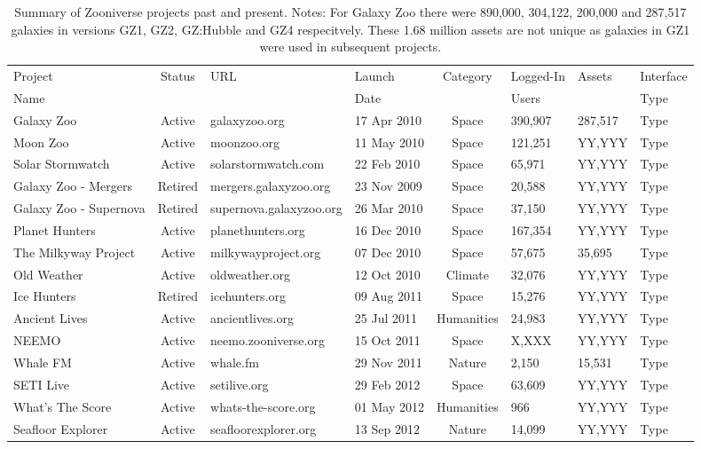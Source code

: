 \documentclass{sigchi}
\begin{document}
\begin{table*}
\begin{center}
\caption{Summary of Zooniverse projects past and present.
Notes: For Galaxy Zoo there were 890,000, 304,122, 200,000 and 287,517 galaxies in versions GZ1, GZ2, GZ:Hubble and GZ4 respecitvely. These 1.68 million assets are not unique as galaxies in GZ1 were used in subsequent projects.}
\begin{tabular}{lcllclll}
\hline
Project & Status & URL & Launch & Category & Logged-In & Assets & Interface \\
Name &  &  & Date &  & Users &  &  Type \\
\hline
Galaxy Zoo & Active & galaxyzoo.org & 17 Apr 2010 & Space & 390,907 & 287,517 & Type \\
Moon Zoo & Active & moonzoo.org & 11 May 2010 & Space & 121,251 & YY,YYY & Type \\
Solar Stormwatch & Active & solarstormwatch.com & 22 Feb 2010 & Space & 65,971 & YY,YYY & Type \\
Galaxy Zoo - Mergers & Retired & mergers.galaxyzoo.org & 23 Nov 2009 & Space & 20,588 & YY,YYY & Type \\
Galaxy Zoo - Supernova & Retired & supernova.galaxyzoo.org & 26 Mar 2010 & Space & 37,150 & YY,YYY & Type \\
Planet Hunters & Active & planethunters.org & 16 Dec 2010 & Space & 167,354 & YY,YYY & Type \\
The Milkyway Project & Active & milkywayproject.org & 07 Dec 2010 & Space & 57,675 & 35,695 & Type \\
Old Weather & Active & oldweather.org & 12 Oct 2010 & Climate & 32,076 & YY,YYY & Type \\
Ice Hunters & Retired & icehunters.org & 09 Aug 2011 & Space & 15,276 & YY,YYY & Type \\
Ancient Lives & Active & ancientlives.org & 25 Jul 2011 & Humanities & 24,983 & YY,YYY & Type \\
NEEMO & Active & neemo.zooniverse.org & 15 Oct 2011 & Space & X,XXX & YY,YYY & Type \\
Whale FM & Active & whale.fm & 29 Nov 2011 & Nature & 2,150 & 15,531 & Type \\
SETI Live & Active & setilive.org & 29 Feb 2012 & Space & 63,609 & YY,YYY & Type \\
What's The Score & Active & whats-the-score.org & 01 May 2012 & Humanities & 966 & YY,YYY & Type \\
Seafloor Explorer & Active & seafloorexplorer.org & 13 Sep 2012 & Nature & 14,099 & YY,YYY & Type \\

\end{tabular}
\end{center}
\end{table*}
\end{document}
